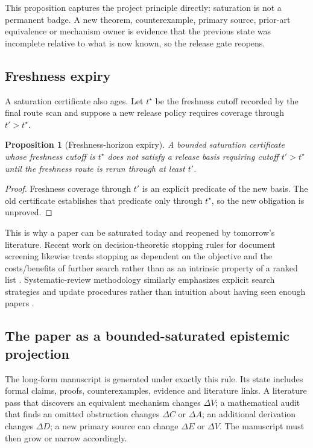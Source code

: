 \documentclass[11pt]{article}
\newtheorem{proposition}{Proposition}
\begin{document}
This proposition captures the project principle directly: saturation is not a permanent badge. A new theorem, counterexample, primary source, prior-art equivalence or mechanism owner is evidence that the previous state was incomplete relative to what is now known, so the release gate reopens.

\subsection{Freshness expiry}

A saturation certificate also ages. Let \(t^\star\) be the freshness cutoff recorded by the final route scan and suppose a new release policy requires coverage through \(t'>t^\star\).

\begin{proposition}[Freshness-horizon expiry]
A bounded saturation certificate whose freshness cutoff is \(t^\star\) does not satisfy a release basis requiring cutoff \(t'>t^\star\) until the freshness route is rerun through at least \(t'\).
\end{proposition}

\begin{proof}
Freshness coverage through \(t'\) is an explicit predicate of the new basis. The old certificate establishes that predicate only through \(t^\star\), so the new obligation is unproved.
\end{proof}

This is why a paper can be saturated today and reopened by tomorrow's literature. Recent work on decision-theoretic stopping rules for document screening likewise treats stopping as dependent on the objective and the costs/benefits of further search rather than as an intrinsic property of a ranked list \cite{fletcher2026}. Systematic-review methodology similarly emphasizes explicit search strategies and update procedures rather than intuition about having seen enough papers \cite{macfarlane2022}.

\subsection{The paper as a bounded-saturated epistemic projection}

The long-form manuscript is generated under exactly this rule. Its state includes formal claims, proofs, counterexamples, evidence and literature links. A literature pass that discovers an equivalent mechanism changes \(\Delta V\); a mathematical audit that finds an omitted obstruction changes \(\Delta C\) or \(\Delta A\); an additional derivation changes \(\Delta D\); a new primary source can change \(\Delta E\) or \(\Delta V\). The manuscript must then grow or narrow accordingly.
\end{document}
